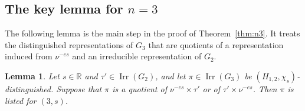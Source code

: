\documentclass[11pt]{amsart}
\numberwithin{equation}{section}
\theoremstyle{plain}
\newtheorem{lemma}[theorem]{Lemma}
\theoremstyle{definition}
\theoremstyle{remark}
\newcommand{\R}{\mathbb{R}}
\DeclareMathOperator{\Irr}{Irr}
\begin{document}
\subsection{The key lemma for \texorpdfstring{$n=3$}{n=3}}\label{ss:n3-key}

The following lemma is the main step in the proof of Theorem~\ref{thm:n3}. It treats the distinguished representations of $G_3$ that are quotients of a representation induced from $\nu^{-es}$ and an irreducible representation of $G_2$.

\begin{lemma}\label{lem:n3-key}
	Let $s\in\R$ and $\tau'\in\Irr(G_2)$, and let $\pi\in\Irr(G_3)$ be $(H_{1,2},\chi_s)$-distinguished. Suppose that $\pi$ is a quotient of $\nu^{-es}\times\tau'$ or of $\tau'\times\nu^{-es}$. Then $\pi$ is listed for $(3,s)$.
\end{lemma}
\end{document}
